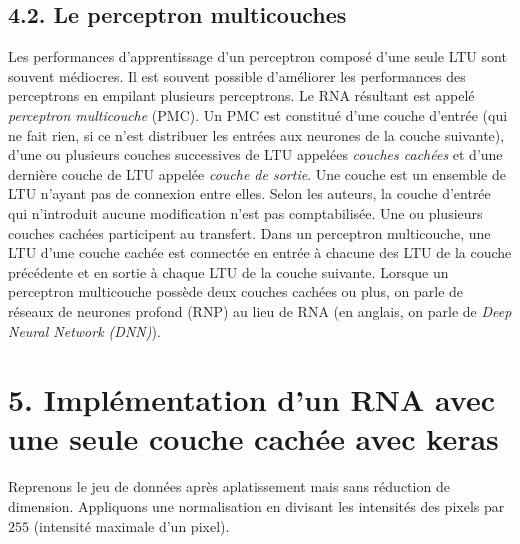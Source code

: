 \documentclass[11pt,]{article}
\begin{document}
\hypertarget{le-perceptron-multicouches}{%
\subsection{4.2. Le perceptron
multicouches}\label{le-perceptron-multicouches}}

Les performances d'apprentissage d'un perceptron composé d'une seule LTU
sont souvent médiocres. Il est souvent possible d'améliorer les
performances des perceptrons en empilant plusieurs perceptrons. Le RNA
résultant est appelé \emph{perceptron multicouche} (PMC). Un PMC est
constitué d'une couche d'entrée (qui ne fait rien, si ce n'est
distribuer les entrées aux neurones de la couche suivante), d'une ou
plusieurs couches successives de LTU appelées \emph{couches cachées} et
d'une dernière couche de LTU appelée \emph{couche de sortie}. Une couche
est un ensemble de LTU n'ayant pas de connexion entre elles. Selon les
auteurs, la couche d'entrée qui n'introduit aucune modification n'est
pas comptabilisée. Une ou plusieurs couches cachées participent au
transfert. Dans un perceptron multicouche, une LTU d'une couche cachée
est connectée en entrée à chacune des LTU de la couche précédente et en
sortie à chaque LTU de la couche suivante. Lorsque un perceptron
multicouche possède deux couches cachées ou plus, on parle de réseaux de
neurones profond (RNP) au lieu de RNA (en anglais, on parle de
\emph{Deep Neural Network (DNN)}).

\hypertarget{implementation-dun-rna-avec-une-seule-couche-cachee-avec}{%
\section{\texorpdfstring{5. Implémentation d'un RNA avec une seule
couche cachée avec
\textsf{keras}}{5. Implémentation d'un RNA avec une seule couche cachée avec }}\label{implementation-dun-rna-avec-une-seule-couche-cachee-avec}}

Reprenons le jeu de données après aplatissement mais sans réduction de
dimension. Appliquons une normalisation en divisant les intensités des
pixels par \(255\) (intensité maximale d'un pixel).
\end{document}
